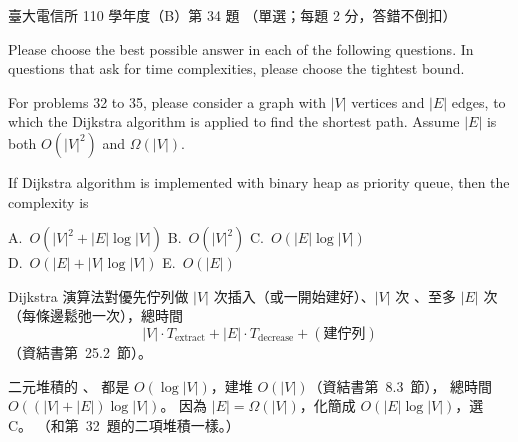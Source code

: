 \begin{pastexam}[label={px:ntu-110-comm-dsa-34}]{臺大電信所 110 學年度（B）第 34 題}
（單選；每題 2 分，答錯不倒扣）

Please choose the best possible answer in each of the following questions. In questions that ask for time complexities, please choose the tightest bound.

For problems 32 to 35, please consider a graph with $|V|$ vertices and $|E|$ edges, to which the Dijkstra algorithm is applied to find the shortest path. Assume $|E|$ is both $O(|V|^2)$ and $\Omega(|V|)$.

If Dijkstra algorithm is implemented with binary heap as priority queue, then the complexity is

A.~$O(|V|^2+|E|\log|V|)$ \qquad B.~$O(|V|^2)$ \qquad C.~$O(|E|\log|V|)$\\
D.~$O(|E|+|V|\log|V|)$ \qquad E.~$O(|E|)$
\end{pastexam}

\begin{pastsoln}
Dijkstra 演算法對優先佇列做 $|V|$ 次插入（或一開始建好）、$|V|$ 次 、至多 $|E|$ 次
（每條邊鬆弛一次），總時間
\[
|V| \cdot T_{\text{extract}} + |E| \cdot T_{\text{decrease}} + (\text{建佇列})
\]
（資結書第~25.2~節）。

二元堆積的 、 都是 $O(\log|V|)$，建堆 $O(|V|)$（資結書第~8.3~節），
總時間 $O((|V| + |E|)\log|V|)$。 因為 $|E| = \Omega(|V|)$，化簡成 $O(|E|\log|V|)$，選 C。
（和第~32~題的二項堆積一樣。）
\end{pastsoln}
